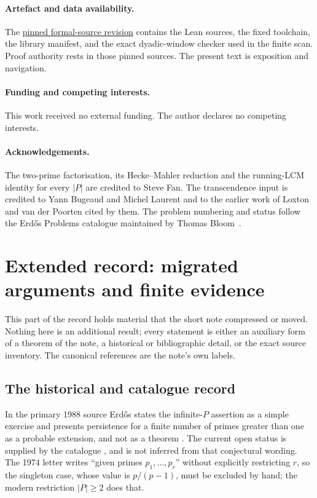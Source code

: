 \documentclass[11pt]{article}
\begin{document}
\paragraph{Artefact and data availability.} The
\href{\sourceurl}{pinned formal-source revision} contains the Lean sources, the
fixed toolchain, the library manifest, and the exact dyadic-window checker used
in the finite scan.  Proof authority rests in those pinned sources.  The
present text is exposition and navigation.

\paragraph{Funding and competing interests.} This work received no external
funding.  The author declares no competing interests.

\paragraph{Acknowledgements.} The two-prime factorisation, its Hecke--Mahler
reduction and the running-LCM identity for every $|P|$ are credited to Steve
Fan.  The transcendence input is credited to Yann Bugeaud and Michel Laurent
and to the earlier work of Loxton and van der Poorten cited by them.  The
problem numbering and status follow the Erd\H{o}s Problems catalogue maintained
by Thomas Bloom~\cite{erdosproblems}.
\section{Extended record: migrated arguments and finite evidence}
\label{long269:long:extended}

This part of the record holds material that the short note compressed or moved.
Nothing here is an additional result; every statement is either an auxiliary
form of a theorem of the note, a historical or bibliographic detail, or the
exact source inventory.  The canonical references are the note's own labels.

\subsection{The historical and catalogue record}\label{long269:long:history}

In the primary 1988 source Erd\H{o}s states the infinite-$P$ assertion as a
simple exercise and presents persistence for a finite number of primes greater
than one as a probable extension, and not as a theorem
\cite[p.~106]{erdos1988}.  The current open status is supplied by the
catalogue \cite{erdosproblems}, and is not inferred from that conjectural
wording.  The 1974 letter writes ``given primes $p_1,\ldots,p_r$'' without
explicitly restricting $r$, so the singleton case, whose value is $p/(p-1)$,
must be excluded by hand; the modern restriction $|P|\ge2$ does that.
\end{document}
